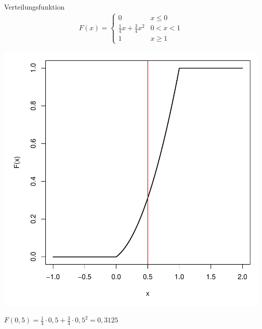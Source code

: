 \documentclass[t,11pt]{beamer}
\begin{document}
\begin{frame}
\begin{block}{Verteilungsfunktion}
	\vspace{-0.5cm}
	\begin{align*}
	F(x)=\begin{cases}
	0 & x\leq 0 \\
	\frac{1}{4}x +\frac{3}{4}x^2  & 0<x<1\\
	1 & x \geq 1
	\end{cases}
	\end{align*}
\end{block}
\begin{center}
	\includegraphics[scale=0.25]{Fx2.pdf}
\end{center}
$F(0,5)=\frac{1}{4}\cdot 0,5 + \frac{3}{4}\cdot 0,5^2 = 0,3125$
\end{frame}
\end{document}
